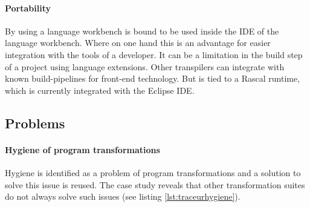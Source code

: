 \paragraph{Portability}
By using a language workbench \projectname is bound to be used inside the IDE of the language workbench. Where on one hand this is an advantage for easier integration with the tools of a developer. It can be a limitation in the build step of a project using language extensions. Other transpilers can integrate with known build-pipelines for front-end technology. But \projectname is tied to a Rascal runtime, which is currently integrated with the Eclipse IDE.

\subsection{Problems}

\paragraph{Hygiene of program transformations}
Hygiene is identified as a problem of program transformations and a solution to solve this issue is reused. The case study reveals that other transformation suites do not always solve such issues (see listing \ref{lst:traceurhygiene}).